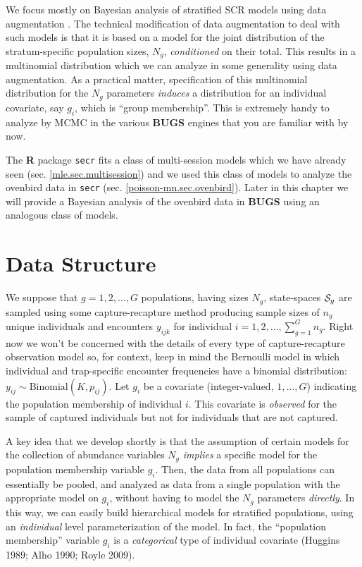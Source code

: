 We focus mostly on Bayesian analysis of stratified SCR models using
data augmentation \citep{royle_etal:2012arXiv,royle_converse:2012}. 
The technical modification of data augmentation to deal with such
models is that it is based on a model for the joint distribution of
the stratum-specific population sizes, 
$N_{g}$, {\it conditioned} on their total. This results in a 
multinomial distribution which we can analyze in some generality using data
augmentation.  As a practical matter, specification of this multinomial
distribution for the $N_{g}$ parameters {\it induces} a distribution
for an individual covariate, say $g_{i}$, which is ``group membership''. 
This is extremely handy to analyze by MCMC in the various {\bf BUGS}
engines that you are familiar with by now.

The {\bf R} package \mbox{\tt secr} fits a class of multi-session
models which we have already seen (sec. \ref{mle.sec.multisession})
and we used this class of models to analyze the ovenbird data in
\mbox{\tt secr} (sec. \ref{poisson-mn.sec.ovenbird}). Later in this
chapter we will provide a Bayesian analysis of the ovenbird data in
{\bf BUGS} using an analogous class of models.










\section{Data Structure}


We suppose that $g=1,2,\ldots,G$ populations, having sizes $N_{g}$,
state-spaces ${\cal S}_{g}$
are sampled using some
capture-recapture method producing sample sizes of $n_{g}$ unique
individuals and encounters
$y_{ijk}$ for individual $i=1,2,\ldots, \sum_{g=1}^{G} n_{g}$.  Right
now we won't be concerned with the details of every type of
capture-recapture observation model so, for context, keep in mind the
Bernoulli model in which individual and trap-specific encounter
frequencies have a binomial distribution: $y_{ij} \sim
\mbox{Binomial}(K,p_{ij})$.  Let $g_{i}$ be a covariate
(integer-valued, $1, \ldots, G$) indicating the population membership
of individual $i$. This covariate is {\it observed} for the sample of
captured individuals but not for individuals that are not captured.


A key idea that we develop shortly is that 
the assumption of certain models for the collection of abundance variables
$N_{g}$ {\it implies} a specific model for the population membership
variable $g_{i}$.  
Then, the data from all populations can essentially
be pooled, and analyzed as data from a single population with the
appropriate model on $g_{i}$, without having to model the $N_{g}$
parameters {\it directly}. In this way, we can easily build
hierarchical models for stratified populations, using an {\it
  individual} level parameterization of the model. In fact, the ``population
membership'' variable $g_{i}$ is a {\it categorical} type of individual
covariate (Huggins 1989; Alho 1990; Royle 2009).  

